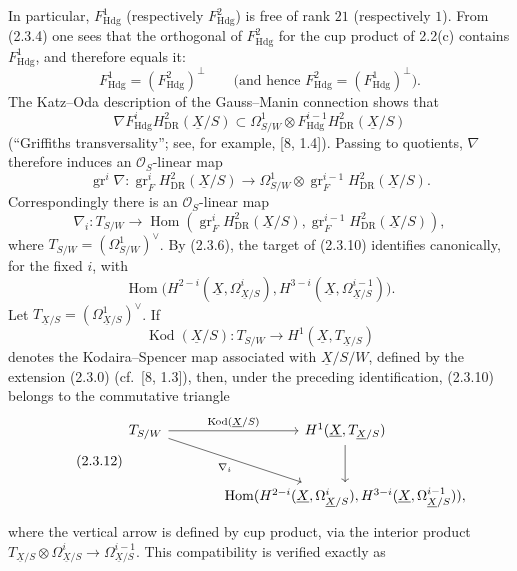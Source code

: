 \documentclass[10pt]{article}
\newcommand{\UX}{\underline{X}}
\begin{document}
In particular, $F^1_{\mathrm{Hdg}}$ (respectively $F^2_{\mathrm{Hdg}}$) is free of rank $21$ (respectively $1$). From (2.3.4) one sees that the orthogonal of $F^2_{\mathrm{Hdg}}$ for the cup product of 2.2(c) contains $F^1_{\mathrm{Hdg}}$, and therefore equals it:
\begin{equation}\tag{2.3.7}
F^1_{\mathrm{Hdg}}=(F^2_{\mathrm{Hdg}})^\perp
\qquad\text{(and hence }F^2_{\mathrm{Hdg}}=(F^1_{\mathrm{Hdg}})^\perp\text{).}
\end{equation}
The Katz--Oda description of the Gauss--Manin connection shows that
\begin{equation}\tag{2.3.8}
\nabla F^i_{\mathrm{Hdg}}H^2_{\mathrm{DR}}(\UX/S)
\subset\Omega^1_{S/W}\otimes F^{i-1}_{\mathrm{Hdg}}H^2_{\mathrm{DR}}(\UX/S)
\end{equation}
(``Griffiths transversality''; see, for example, [8, 1.4]). Passing to quotients, $\nabla$ therefore induces an $\mathcal O_S$-linear map
\begin{equation}\tag{2.3.9}
\operatorname{gr}^i\nabla:\operatorname{gr}^i_FH^2_{\mathrm{DR}}(\UX/S)
\longrightarrow\Omega^1_{S/W}\otimes\operatorname{gr}^{i-1}_F H^2_{\mathrm{DR}}(\UX/S).
\end{equation}
Correspondingly there is an $\mathcal O_S$-linear map
\begin{equation}\tag{2.3.10}
\nabla_i:T_{S/W}\longrightarrow
\operatorname{Hom}(\operatorname{gr}^i_FH^2_{\mathrm{DR}}(\UX/S),
\operatorname{gr}^{i-1}_FH^2_{\mathrm{DR}}(\UX/S)),
\end{equation}
where $T_{S/W}=(\Omega^1_{S/W})^\vee$. By (2.3.6), the target of (2.3.10) identifies canonically, for the fixed $i$, with
\[
\operatorname{Hom}\bigl(H^{2-i}(\UX,\Omega^i_{\UX/S}),
H^{3-i}(\UX,\Omega^{i-1}_{\UX/S})\bigr).
\]
Let $T_{\UX/S}=(\Omega^1_{\UX/S})^\vee$. If
\begin{equation}\tag{2.3.11}
\operatorname{Kod}(\UX/S):T_{S/W}\longrightarrow H^1(\UX,T_{\UX/S})
\end{equation}
denotes the Kodaira--Spencer map associated with $\UX/S/W$, defined by the extension (2.3.0) (cf.~[8, 1.3]), then, under the preceding identification, (2.3.10) belongs to the commutative triangle
\begin{equation}\tag{2.3.12}
\begin{tikzcd}[column sep=large,row sep=large]
T_{S/W}\arrow[r,"\operatorname{Kod}(\UX/S)"]\arrow[dr,"\nabla_i"']&H^1(\UX,T_{\UX/S})\arrow[d]\\
&\operatorname{Hom}(H^{2-i}(\UX,\Omega^i_{\UX/S}),H^{3-i}(\UX,\Omega^{i-1}_{\UX/S})),
\end{tikzcd}
\end{equation}
where the vertical arrow is defined by cup product, via the interior product $T_{\UX/S}\otimes\Omega^i_{\UX/S}\to\Omega^{i-1}_{\UX/S}$. This compatibility is verified exactly as
\newpage
\setcounter{footnote}{0}
\fontsize{10.2pt}{12.04pt}\selectfont
\end{document}
